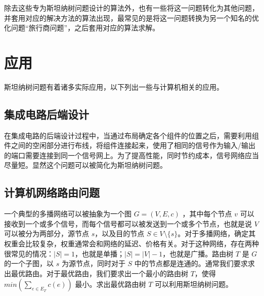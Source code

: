 \documentclass[cyan,normal,cn]{elegantnote}
\begin{document}
除去这些专为斯坦纳树问题设计的算法外，也有一些将这一问题转化为其他问题，并套用对应的解决方法的算法出现，最常见的是将这一问题转换为另一个知名的优化问题“旅行商问题”，之后套用对应的算法求解。


\section{应用}

斯坦纳树问题有着诸多实际应用，以下列出一些与计算机相关的应用。

\subsection{集成电路后端设计}

在集成电路的后端设计过程中，当通过布局确定各个组件的位置之后，需要利用组件之间的空闲部分进行布线，将组件连接起来，使用了相同的信号作为输入/输出的端口需要连接到同一个信号网上。为了提高性能，同时节约成本，信号网络应当尽量短。显然这个问题可以被简化为斯坦纳树问题。

\subsection{计算机网络路由问题}

一个典型的多播网络可以被抽象为一个图 $G = (V, E, c)$ ，其中每个节点 $v$ 可以接收到一个或多个信号，而每个信号都可以被发送到一个或多个节点，也就是说 $V$ 可以被分为两部分，源节点 $s$，以及目的节点 $S \in V \setminus \{s\}$。对于多播网络，确定其权重会比较复杂，权重通常会和网络的延迟、价格有关。对于这种网络，存在两种很常见的情况：$|S| = 1$，也就是单播；$|S| = |V| - 1$，也就是广播。路由树 $T$ 是 $G$ 的一个子图，以 $s$ 为源节点，同时对于 $S$ 中的节点都是连通的。通常我们要求求出最优路由。对于最优路由，我们要求出一个最小的路由树 $T$，使得 $min(\sum_{e \in E_T} c(e))$ 最小。求出最优路由树 $T$ 可以利用斯坦纳树问题。
\end{document}
